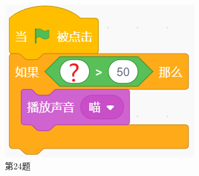 \documentclass[10pt, a4paper]{article}
\begin{document}
    \begin{figure}[htbp]
        \centering
        \begin{minipage}[t]{.16\textwidth}
            \centering
            \includegraphics[width=\textwidth]{24.png}
            \caption*{第24题}
        \end{minipage}
        \begin{minipage}[t]{.15\textwidth}
            \centering

\end{minipage}
\end{figure}
\end{document}
